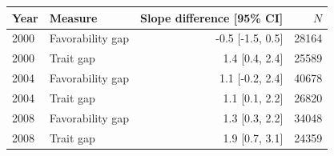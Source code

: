 \begin{tabular}{llrr}
\toprule
Year & Measure & Slope difference [95\% CI] & $N$ \\
\midrule
2000 & Favorability gap & -0.5 [-1.5, 0.5] & 28164 \\
2000 & Trait gap & 1.4 [0.4, 2.4] & 25589 \\
2004 & Favorability gap & 1.1 [-0.2, 2.4] & 40678 \\
2004 & Trait gap & 1.1 [0.1, 2.2] & 26820 \\
2008 & Favorability gap & 1.3 [0.3, 2.2] & 34048 \\
2008 & Trait gap & 1.9 [0.7, 3.1] & 24359 \\
\bottomrule
\end{tabular}
